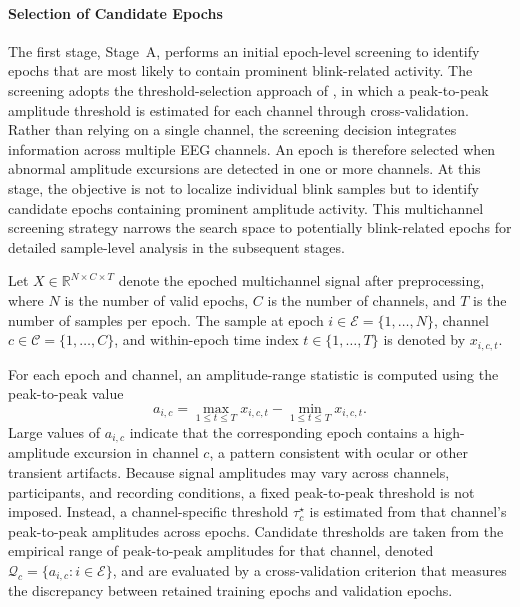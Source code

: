 \paragraph{Selection of Candidate Epochs}

The first stage, Stage~A, performs an initial epoch-level screening to identify epochs that are most likely to contain prominent blink-related activity. The screening adopts the threshold-selection approach of \citep{jas2017autoreject}, in which a peak-to-peak amplitude threshold is estimated for each channel through cross-validation. Rather than relying on a single channel, the screening decision integrates information across multiple EEG channels. An epoch is therefore selected when abnormal amplitude excursions are detected in one or more channels. At this stage, the objective is not to localize individual blink samples but to identify candidate epochs containing prominent amplitude activity. This multichannel screening strategy narrows the search space to potentially blink-related epochs for detailed sample-level analysis in the subsequent stages.




Let \(X \in \mathbb{R}^{N \times C \times T}\) denote the epoched multichannel
signal after preprocessing, where \(N\) is the number of valid epochs, \(C\) is
the number of channels, and \(T\) is the number of samples per epoch. The sample
at epoch \(i \in \mathcal{E}=\{1,\ldots,N\}\), channel
\(c \in \mathcal{C}=\{1,\ldots,C\}\), and within-epoch time index
\(t \in \{1,\ldots,T\}\) is denoted by \(x_{i,c,t}\).

For each epoch and channel, an amplitude-range statistic is computed using the  peak-to-peak value
\begin{equation}
a_{i,c}
= \max_{1 \leq t \leq T} x_{i,c,t}
- \min_{1 \leq t \leq T} x_{i,c,t}.
\end{equation}
Large values of \(a_{i,c}\) indicate that the corresponding epoch contains a high-amplitude excursion in channel \(c\), a pattern consistent with ocular or other transient artifacts.
Because signal amplitudes may vary across channels, participants, and recording conditions, a fixed peak-to-peak threshold is not imposed.
Instead, a channel-specific threshold \(\tau_c^\star\) is estimated from that channel's peak-to-peak amplitudes across epochs.
Candidate thresholds are taken from the empirical range of peak-to-peak amplitudes for that channel, denoted
\(\mathcal{Q}_c=\{a_{i,c}: i \in \mathcal{E}\}\), and are evaluated by a
cross-validation criterion that measures the discrepancy between retained training epochs and validation epochs.

